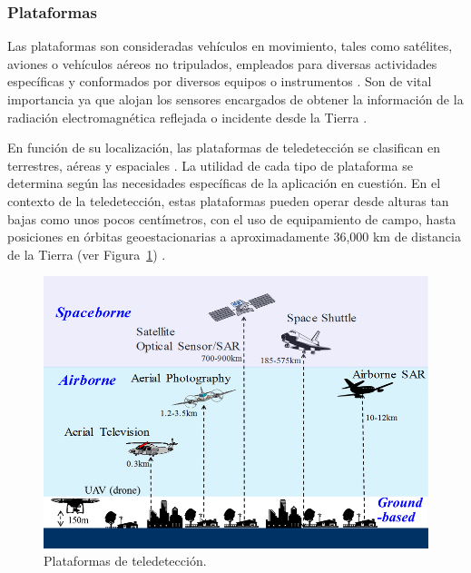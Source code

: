 \begin{table}[H]
\begin{tabularx}{1\textwidth}{lX}
    \end{tabularx}
    \begin{minipage}{\textwidth}
        \vspace{10pt}
        \label{tab:PropiedadesMW}
    \end{minipage}
\end{table}

\subsubsection{Plataformas}

Las plataformas son consideradas vehículos en movimiento, tales como satélites, aviones o vehículos aéreos no tripulados, empleados para diversas actividades específicas y conformados por diversos equipos o instrumentos \cite{tempfli2009principles}. Son de vital importancia ya que alojan los sensores encargados de obtener la información de la radiación electromagnética reflejada o incidente desde la Tierra \cite{chuvieco2016fundamentals}.

En función de su localización, las plataformas de teledetección se clasifican en terrestres, aéreas y espaciales \cite{canada2007fundamentals}. La utilidad de cada tipo de plataforma se determina según las necesidades específicas de la aplicación en cuestión. En el contexto de la teledetección, estas plataformas pueden operar desde alturas tan bajas como unos pocos centímetros, con el uso de equipamiento de campo, hasta posiciones en órbitas geoestacionarias a aproximadamente 36,000 km de distancia de la Tierra (ver Figura~\ref{fig:PlataformasTeledeteccion}) \cite{tempfli2009principles}.

\begin{figure}[H]
    \begin{center}
        \includegraphics[width=1\textwidth]{Images/Plataformas.png}
    \end{center}
    \caption{Plataformas de teledetección.}
    \label{fig:PlataformasTeledeteccion}
\end{figure}

